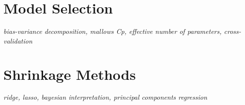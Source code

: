 \documentclass[../../../main.tex]{subfiles}
\begin{document}
\section{Model Selection}
\textit{bias-variance decomposition, mallows Cp, effective number of parameters, cross-validation}

\section{Shrinkage Methods}
\textit{ridge, lasso, bayesian interpretation, principal components regression}

\printbibliography[
    heading=subbibintoc,
    title={References}
]
\end{document}

